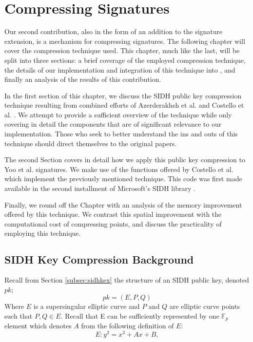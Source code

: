 \chapter{Compressing Signatures}
\label{sec:compress}

Our second contribution, also in the form of an addition to the \sidh signature extension, is a mechanism for compressing signatures. The following chapter will cover the compression technique used. This chapter, much like the last, will be split into three sections: a brief coverage of the employed compression technique, the details of our implementation and integration of this technique into \sidh, and finally an analysis of the results of this contribution.

In the first section of this chapter, we discuss the SIDH public key compression technique resulting from combined efforts of Azerderakhsh et al. \cite{compwr} and Costello et al. \cite{pkcomp}. We attempt to provide a sufficient overview of the technique while only covering in detail the components that are of significant relevance to our implementation. Those who seek to better understand the ins and outs of this technique should direct themselves to the original papers.  

The second Section covers in detail how we apply this public key compression to Yoo et al. signatures. We make use of the functions offered by Costello et al. which implement the previously mentioned technique. This code was first made available in the second installment of Microsoft's SIDH library \cite{sidhcode}.

Finally, we round off the Chapter with an analysis of the memory improvement offered by this technique. We contrast this spatial improvement with the computational cost of compressing points, and discuss the practicality of employing this technique. 

\section{SIDH Key Compression Background}

Recall from Section \ref{subsec:sidhkex} the structure of an SIDH public key, denoted $pk$;
$$
pk = (E, P, Q)
$$
Where $E$ is a supersingular elliptic curve and $P$ and $Q$ are elliptic curve points such that $P, Q \in E$. Recall that E can be sufficiently represented by one $\mathbb{F}_{p}$ element which denotes $A$ from the following definition of $E$:
$$
E : y^2 = x^3 + Ax + B,
$$

